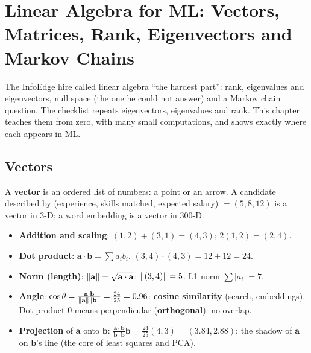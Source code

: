\chapter{Linear Algebra for ML: Vectors, Matrices, Rank, Eigenvectors and Markov Chains}

The InfoEdge hire called linear algebra ``the hardest part'': rank, eigenvalues and eigenvectors, null space (the one he could not answer) and a Markov chain
question. The checklist repeats eigenvectors, eigenvalues and rank. This chapter teaches them from zero, with many small computations, and shows exactly where
each appears in ML.

\section{Vectors}
A \textbf{vector} is an ordered list of numbers: a point or an arrow. A candidate described by (experience, skills matched, expected salary) $= (5, 8, 12)$ is a vector in
3-D; a word embedding is a vector in 300-D.
\begin{itemize}
\item \textbf{Addition and scaling}: $(1,2) + (3,1) = (4,3)$; $2(1,2) = (2,4)$.
\item \textbf{Dot product}: $\mathbf a\cdot\mathbf b = \sum a_ib_i$. $(3,4)\cdot(4,3) = 12 + 12 = 24$.
\item \textbf{Norm (length)}: $\lVert \mathbf a\rVert = \sqrt{\mathbf a\cdot\mathbf a}$; $\lVert (3,4)\rVert = 5$. L1 norm $\sum|a_i| = 7$.
\item \textbf{Angle}: $\cos\theta = \frac{\mathbf a\cdot\mathbf b}{\lVert \mathbf a\rVert\lVert \mathbf b\rVert} = \frac{24}{25} = 0.96$: \textbf{cosine similarity} (search, embeddings). Dot
  product 0 means perpendicular (\textbf{orthogonal}): no overlap.
\item \textbf{Projection} of $\mathbf a$ onto $\mathbf b$: $\frac{\mathbf a\cdot\mathbf b}{\mathbf b\cdot\mathbf b}\mathbf b = \frac{24}{25}(4,3) = (3.84, 2.88)$: the shadow of $\mathbf a$ on $\mathbf b$'s
  line (the core of least squares and PCA).
\end{itemize}

